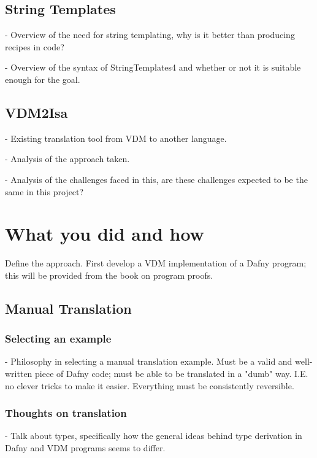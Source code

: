 \documentclass{entcs}
\begin{document}
\subsection{String Templates}

- Overview of the need for string templating, why is it better than producing recipes in code?

- Overview of the syntax of StringTemplates4 and whether or not it is suitable enough for the goal.

\subsection{VDM2Isa}

- Existing translation tool from VDM to another language. 

- Analysis of the approach taken.

- Analysis of the challenges faced in this, are these challenges expected to be the same in this project?

\section{What you did and how}

Define the approach. 
First develop a VDM implementation of a Dafny program; this will be provided from the book on program proofs.

\subsection{Manual Translation}

\subsubsection{Selecting an example}

- Philosophy in selecting a manual translation example. Must be a valid and well-written piece of Dafny code; must be able to be translated in a "dumb" way. I.E. no clever tricks to make it easier. Everything must be consistently reversible.

\subsubsection{Thoughts on translation}

- Talk about types, specifically how the general ideas behind type derivation in Dafny and VDM programs seems to differ.
\end{document}

